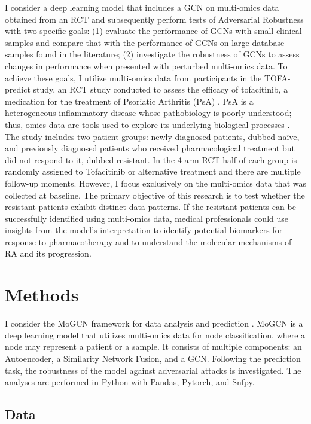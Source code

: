 \documentclass[unnumsec,webpdf,modern,large]{oup-authoring-template}
\theoremstyle{thmstyleone}%
\theoremstyle{thmstyletwo}%
\theoremstyle{thmstylethree}%
\begin{document}
I consider a deep learning model that includes a GCN on multi-omics data obtained from an RCT and subsequently perform tests of Adversarial Robustness with two specific goals: (1) evaluate the performance of GCNs with small clinical samples and compare that with the performance of GCNs on large database samples found in the literature; (2) investigate the robustness of GCNs to assess changes in performance when presented with perturbed multi-omics data. 
To achieve these goals, I utilize multi-omics data from participants in the TOFA-predict study, an RCT study conducted to assess the efficacy of tofacitinib, a medication for the treatment of Psoriatic Arthritis (PsA) \cite{kleinrensink2022tofa}. PsA is a heterogeneous inflammatory disease whose pathobiology is poorly understood; thus, omics data are tools used to explore its underlying biological processes \cite{kleinrensink2022tofa}. The study includes two patient groups: newly diagnosed patients, dubbed naïve, and previously diagnosed patients who received pharmacological treatment but did not respond to it, dubbed resistant. In the 4-arm RCT half of each group is randomly assigned to Tofacitinib or alternative treatment and there are multiple follow-up moments. However, I focus exclusively on the multi-omics data that was collected at baseline. The primary objective of this research is to test whether the resistant patients exhibit distinct data patterns. If the resistant patients can be successfully identified using multi-omics data, medical professionals could use insights from the model’s interpretation to identify potential biomarkers for response to pharmacotherapy and to understand the molecular mechanisms of RA and its progression.

\section{Methods}

I consider the MoGCN framework for data analysis and prediction \cite{Li2022}. MoGCN is a deep learning model that utilizes multi-omics data for node classification, where a node may represent a patient or a sample. It consists of multiple components: an Autoencoder, a Similarity Network Fusion, and a GCN. Following the prediction task, the robustness of the model against adversarial attacks is investigated. The analyses are performed in Python with Pandas, Pytorch, and Snfpy.

\subsection{Data}
\end{document}
